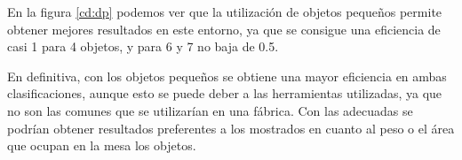 \begin{itemize}
	\noindent En la figura \ref{cd:dp} podemos ver que la utilización de objetos pequeños permite obtener mejores resultados en este entorno, ya que se consigue una eficiencia de casi 1 para 4 objetos, y para 6 y 7 no baja de 0.5. \\
	
\end{itemize} 

\noindent En definitiva, con los objetos pequeños se obtiene una mayor eficiencia en ambas clasificaciones, aunque esto se puede deber a las herramientas utilizadas, ya que no son las comunes que se utilizarían en una fábrica. Con las adecuadas se podrían obtener resultados preferentes a los mostrados en cuanto al peso o el área que ocupan en la mesa los objetos. \\